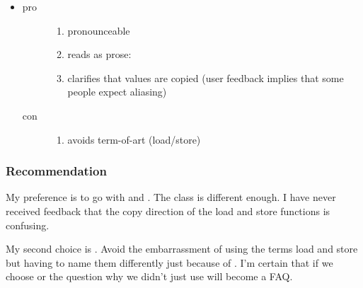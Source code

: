 \begin{itemize}
  \item {}
    \begin{description}
      \item[pro]
        \begin{enumerate}
          \item pronounceable
          \item reads as prose: 
          \item clarifies that values are copied
            (user feedback implies that some people expect aliasing)
        \end{enumerate}
      \item[con]
        \begin{enumerate}
          \item avoids term-of-art (load/store)
        \end{enumerate}
    \end{description}

\end{itemize}

\subsubsection{Recommendation}
My preference is to go with  and .
The  class is different enough.
I have never received feedback that the copy direction of the load and store functions is confusing.

My second choice is .
Avoid the embarrassment of using the terms load and store but having to name them differently just because of .
I'm certain that if we choose  or  the question why we didn't just use  will become a FAQ.

